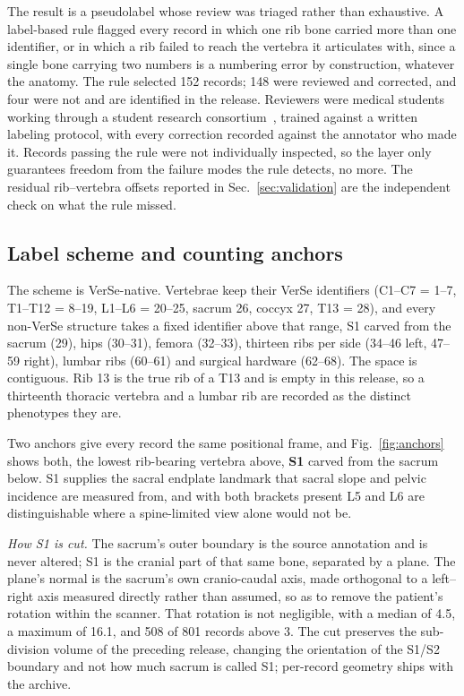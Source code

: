 \documentclass[aapm,mph,amsmath,amssymb,reprint]{revtex4-2}
\newif\ifreview \reviewtrue
\newcommand{\consortium}{\ifreview a student research consortium\else OpenSpineConsortium\fi}
\begin{document}
The result is a pseudolabel whose review was triaged rather than exhaustive. A label-based
rule flagged every record in which one rib
bone carried more than one identifier, or in which a rib failed to reach the vertebra it
articulates with, since a single bone carrying two numbers is a numbering error by construction,
whatever the anatomy. The rule selected 152 records; 148 were reviewed and corrected, and four
were not and are identified in the release. Reviewers were medical students working through
\consortium~\cite{osc2026}, trained against a written labeling protocol, with every
correction recorded against the annotator who made it. Records passing the rule were not
individually inspected, so the layer only guarantees freedom from the failure modes the rule detects, no more. The residual rib--vertebra offsets reported in
Sec.~\ref{sec:validation} are the independent check on what the rule missed.

\subsection{Label scheme and counting anchors}\label{sec:anchors}

The scheme is VerSe-native. Vertebrae keep their VerSe identifiers (C1--C7 = 1--7,
T1--T12 = 8--19, L1--L6 = 20--25, sacrum 26, coccyx 27, T13 = 28), and every non-VerSe
structure takes a fixed identifier above that range, S1 carved from the sacrum (29), hips (30--31), femora (32--33), thirteen ribs per side (34--46 left, 47--59 right), lumbar ribs (60--61) and surgical hardware (62--68). The space is contiguous. Rib 13 is the true rib of a T13 and is empty in this release, so a thirteenth thoracic vertebra and a lumbar rib are recorded as the distinct phenotypes they are.

Two anchors give every record the same positional frame, and Fig.~\ref{fig:anchors} shows both, the lowest rib-bearing vertebra above, \textbf{S1} carved from the sacrum below.  S1 supplies the sacral endplate
landmark that sacral slope and pelvic incidence are measured from, and with both brackets
present L5 and L6 are distinguishable where a spine-limited view alone would not be.

\emph{How S1 is cut.} The sacrum's outer boundary is the source annotation and is never
altered; S1 is the cranial part of that same bone, separated by a plane. The plane's normal
is the sacrum's own cranio-caudal axis, made orthogonal to a left--right axis
measured directly rather than assumed, so as to remove the patient's rotation within the scanner. That rotation is not negligible, with a median of 4.5\textdegree{}, a maximum of 16.1\textdegree{}, and 508 of 801 records above
3\textdegree{}. The cut preserves the sub-division volume of the preceding release,
changing the orientation of the S1/S2 boundary and not how much sacrum is called S1;
per-record geometry ships with the archive.
\end{document}
